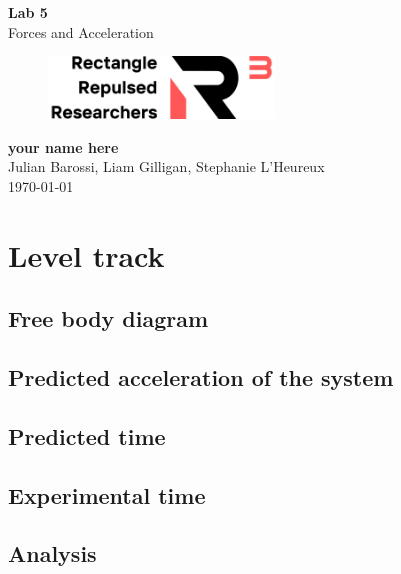 \documentclass[11pt, letterpaper, includehead]{article}
\begin{document}
\begin{titlepage}
  \begin{center}
    \Huge{\textbf{Lab 5}}\\
    \Huge{Forces and Acceleration}
    \vfill
    \begin{figure}[H] %
      \centering 
      \includegraphics[width=6cm]{../logo.png}
    \end{figure}
    \large{\textbf{your name here}}\\
    \large{Julian Barossi, Liam Gilligan, Stephanie L'Heureux}\\
    \vspace{0.5cm}
    \normalsize
    \today
  \end{center}
\end{titlepage}

\tableofcontents
\pagebreak %

\pagestyle{fancy}
\fancyhead{}

\section{Level track} %
\subsection{Free body diagram} %
\subsection{Predicted acceleration of the system} %
\subsection{Predicted time} %
\subsection{Experimental time} %
\subsection{Analysis} %
\end{document}
